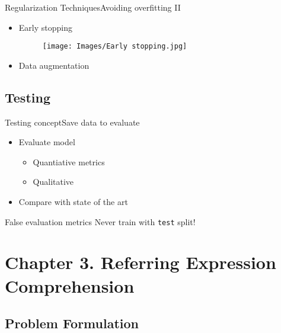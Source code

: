 \documentclass{beamer}
\begin{document}
\begin{frame}{Regularization Techniques}{Avoiding overfitting II}
  \begin{itemize}
    \item Early stopping
    \begin{figure}
      \texttt{[image: Images/Early stopping.jpg]}
    \end{figure}
    \item Data augmentation
  \end{itemize}
\end{frame}


\subsection{Testing}

\begin{frame}{Testing concept}{Save data to evaluate}
  \begin{itemize}
    \item Evaluate model
    \begin{itemize}
      \item Quantiative metrics
      \item Qualitative
    \end{itemize}
    \item Compare with state of the art
  \end{itemize}
  \begin{alertblock}{False evaluation metrics}
    Never train with \texttt{test} split!
  \end{alertblock}
\end{frame}



\section{Chapter 3. Referring Expression Comprehension}

\subsection{Problem Formulation}
\end{document}
